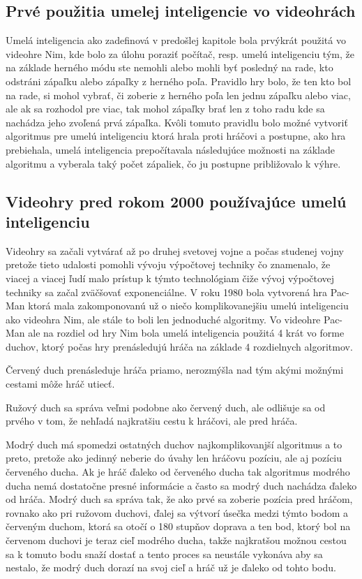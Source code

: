 \documentclass[10pt,oneside,slovak,a4paper]{article}
\begin{document}
\subsection{Prvé použitia umelej inteligencie vo videohrách} \label{kapitola2.1}
Umelá inteligencia ako zadefinová v predošlej kapitole bola prvýkrát použitá vo videohre Nim, kde bolo za úlohu poraziť počítač, resp. umelú inteligenciu tým, že na základe herného módu ste nemohli alebo mohli byť posledný na rade, kto odstráni zápaľku alebo zápaľky z herného poľa. Pravidlo hry bolo, že ten kto bol na rade, si mohol vybrať, či zoberie z herného poľa len jednu zápaľku alebo viac, ale ak sa rozhodol pre viac, tak mohol zápaľky brať len z toho radu kde sa nachádza jeho zvoľená prvá zápaľka. Kvôli tomuto pravidlu bolo možné vytvoriť algoritmus pre umelú inteligenciu ktorá hrala proti hráčovi a postupne, ako hra prebiehala, umelá inteligencia prepočítavala následujúce možnosti na základe algoritmu a vyberala taký počet zápaliek, čo ju postupne približovalo k výhre.

\subsection{Videohry pred rokom 2000 používajúce umelú inteligenciu} \label{kapitola2.2}
Videohry sa začali vytvárať až po druhej svetovej vojne a počas studenej vojny pretože tieto udalosti pomohli vývoju výpočtovej techniky čo znamenalo, že viacej a viacej ľudí malo prístup k týmto technológiam čiže vývoj výpočtovej techniky sa začal zväčšovať exponenciálne. V roku 1980 bola vytvorená hra Pac-Man ktorá mala zakomponovanú už o niečo komplikovanejšiu umelú inteligenciu ako videohra Nim, ale stále to boli len jednoduché algoritmy. Vo videohre Pac-Man ale na rozdiel od hry Nim bola umelá inteligencia použitá 4 krát vo forme duchov, ktorý počas hry prenásledujú hráča na základe 4 rozdielnych algoritmov. \cite{PacmanAI}

Červený duch prenásleduje hráča priamo, nerozmýšla nad tým akými možnými cestami môže hráč utiecť.

Ružový duch sa správa veľmi podobne ako červený duch, ale odlišuje sa od prvého v tom, že nehľadá najkratšiu cestu k hráčovi, ale pred hráča.

Modrý duch má spomedzi ostatných duchov najkomplikovanjší algoritmus a to preto, pretože ako jedinný neberie do úvahy len hráčovu pozíciu, ale aj pozíciu červeného ducha. Ak je hráč ďaleko od červeného ducha tak algoritmus modrého ducha nemá dostatočne presné informácie a často sa modrý duch nachádza ďaleko od hráča. Modrý duch sa správa tak, že ako prvé sa zoberie pozícia pred hráčom, rovnako ako pri ružovom duchovi, ďalej sa výtvorí úsečka medzi týmto bodom a červeným duchom, ktorá sa otočí o 180 stupňov doprava a ten bod, ktorý bol na červenom duchovi je teraz cieľ modrého ducha, takže najkratšou možnou cestou sa k tomuto bodu snaží dostať a tento proces sa neustále vykonáva aby sa nestalo, že modrý duch dorazí na svoj cieľ a hráč už je ďaleko od tohto bodu.
\end{document}
